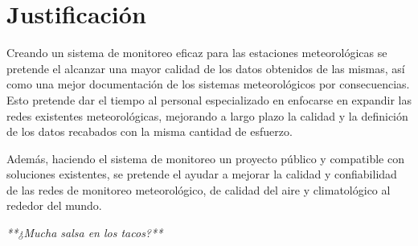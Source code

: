 \section{Justificación}

Creando un sistema de monitoreo eficaz para las estaciones meteorológicas se pretende el alcanzar una mayor calidad de los datos obtenidos de las mismas, así como una mejor documentación de los sistemas meteorológicos por consecuencias. Esto pretende dar el tiempo al personal especializado en enfocarse en expandir las redes existentes meteorológicas, mejorando a largo plazo la calidad y la definición de los datos recabados con la misma cantidad de esfuerzo.

Además, haciendo el sistema de monitoreo un proyecto público y compatible con soluciones existentes, se pretende el ayudar a mejorar la calidad y confiabilidad de las redes de monitoreo meteorológico, de calidad del aire y climatológico al rededor del mundo.

\textit{**¿Mucha salsa en los tacos?**}
